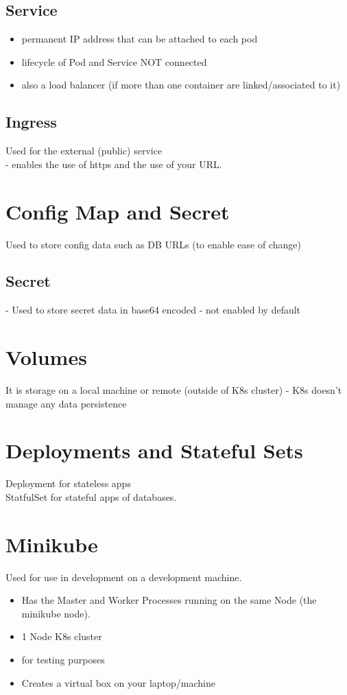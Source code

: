 \subsection{Service}\label{subsec:service}
\begin{itemize}
    \item permanent IP address that can be attached to each pod
    \item lifecycle of Pod and Service NOT connected
    \item also a load balancer (if more than one container are linked/associated to it)
\end{itemize}

\subsection{Ingress}\label{subsec:ingress}
Used for the external (public) service\\
 - enables the use of https and the use of your URL.

\section{Config Map and Secret}\label{sec:config-map-and-sercret}
Used to store config data such as DB URLs (to enable ease of change)
\subsection{Secret}
 - Used to store secret data in base64 encoded
 - not enabled by default


\section{Volumes}\label{sec:volumes}
It is storage on a local machine or remote (outside of K8s cluster)
 - K8s doesn't manage any data persistence

\section{Deployments and Stateful Sets}\label{sec:deployments-and-stateful-sets}
Deployment for stateless apps\\
StatfulSet for stateful apps of databases.

\section{Minikube}\label{sec:minikube}
Used for use in development on a development machine.
\begin{itemize}
    \item Has the Master and Worker Processes running on the same Node (the minikube node).
    \item 1 Node K8s cluster
    \item for testing purposes
    \item Creates a virtual box on your laptop/machine
\end{itemize}

